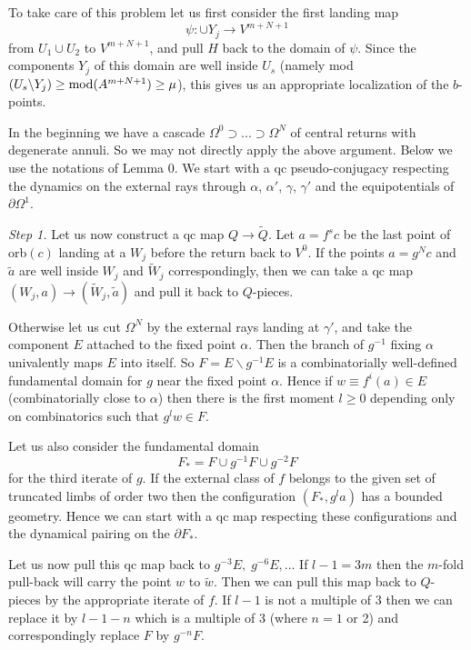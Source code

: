 To take care of this problem
let us first consider the first landing map 
$$\psi: \cup Y_j\rightarrow V^{m+N+1}$$ 
from $U_1\cup U_2$ to $V^{m+N+1}$,
and pull $H$ back to the domain of $\psi$. Since the components $Y_j$
 of this domain are
well inside $U_s$ (namely
 mod$(U_s\backslash Y_j)\geq {\rm mod}(A^{m+N+1})\geq\mu$), this gives us
an appropriate localization of the $b$-points. 



\medskip{} In the beginning we have
a cascade $\Omega^0\supset...\supset \Omega^N$ of central returns with degenerate
annuli. So we may not directly apply the above argument.
Below we use the notations of  Lemma 0. We start with a qc pseudo-conjugacy
respecting the dynamics on the external rays through $\alpha$, $\alpha'$,
$\gamma$, $\gamma'$ and the equipotentials of $\partial \Omega^1$. 

\smallskip
{\sl Step 1.} Let us now construct a qc map $Q\rightarrow \tilde Q$.
Let $a=f^s c$ be the last point of orb$(c)$ landing at a $W_j$
before the return back to $V^0$.
 If the points $a=g^N c$ and $\tilde  a$
are well inside $W_j$ and $\tilde W_j$ correspondingly, then we can take
a qc map $(W_j,a)\rightarrow (\tilde W_j,\tilde a)$ and pull it back to
$Q$-pieces.   

Otherwise let us cut $\Omega^N$ by the external rays landing at 
$\gamma'$, and take the component $E$ attached to the fixed point $\alpha$.
Then the branch of $g^{-1}$ fixing $\alpha$ univalently maps $E$ into
itself. So $F=E\backslash g^{-1} E$ is a combinatorially well-defined 
fundamental domain for $g$ near the fixed point $\alpha$. Hence 
if $w\equiv f^i(a)\in E$ (combinatorially close to $\alpha$) then
there is the first moment $l\geq 0$ depending only on 
combinatorics such that $g^l w\in F$.

Let us also consider the fundamental domain 
$$F_*=F\cup g^{-1} F\cup g^{-2}F$$ for the 
third iterate of $g$.
If the external class of $f$ belongs to the given set of truncated limbs of
order two then the configuration  $(F_*,g^la)$ has a bounded geometry.
 Hence we can 
start with a qc map respecting these configurations and the dynamical pairing
on the $\partial F_*$.

Let us now pull this qc map back to $g^{-3}E,\; g^{-6}E,...$
If $l-1=3m$ then the $m$-fold pull-back will carry the point $w$ 
to $\tilde w$. Then we can pull this map back to $Q$-pieces by the
appropriate iterate of $f$.
If $l-1$ is not a multiple of 3 then we can replace
it by $l-1-n$ which is a multiple of 3 (where $n=1$ or 2) and correspondingly
replace $F$ by $g^{-n} F$.

